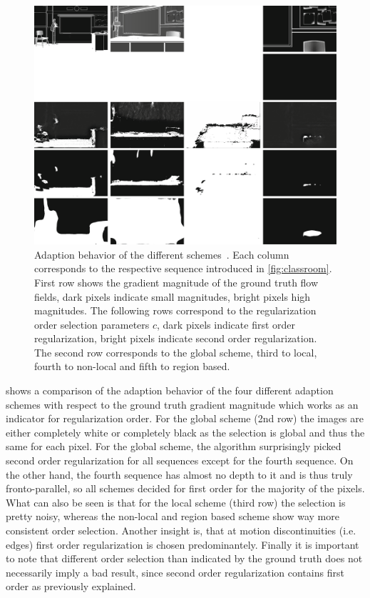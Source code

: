 \documentclass[journal]{vgtc}
\begin{document}
\begin{figure}[htb]
\centering
\includegraphics[width=0.9\linewidth]{images/classroom_c.png}
\caption{Adaption behavior of the different schemes~\cite{daspaper}. 
Each column corresponds to the respective sequence introduced in \cref{fig:classroom}.
First row shows the gradient magnitude of the ground truth flow fields, dark pixels indicate small magnitudes,
bright pixels high magnitudes.
The following rows correspond to the regularization order selection parameters $c$, dark pixels indicate first order regularization, bright pixels indicate second order regularization.
The second row corresponds to the global scheme, third to local, fourth to non-local and fifth to region based. 
}
\label{fig:classroom_c}
\end{figure}

 shows a comparison of the adaption behavior of the four different adaption schemes with respect to the ground truth gradient magnitude which works as an indicator for regularization order.
For the global scheme (2nd row) the images are either completely white or completely black as the selection is global and thus the same for each pixel.
For the global scheme, the algorithm surprisingly picked second order regularization for all sequences except for the fourth sequence.
On the other hand, the fourth sequence has almost no depth to it and is thus truly fronto-parallel, so all schemes decided for first order for the majority of the pixels.
What can also be seen is that for the local scheme (third row) the selection is pretty noisy, whereas the non-local and region based scheme show way more consistent order selection.
Another insight is, that at motion discontinuities (i.e. edges) first order regularization is chosen predominantely.
Finally it is important to note that different order selection than indicated by the ground truth does not necessarily imply a bad result, since second order regularization contains first order as previously explained.
\end{document}
